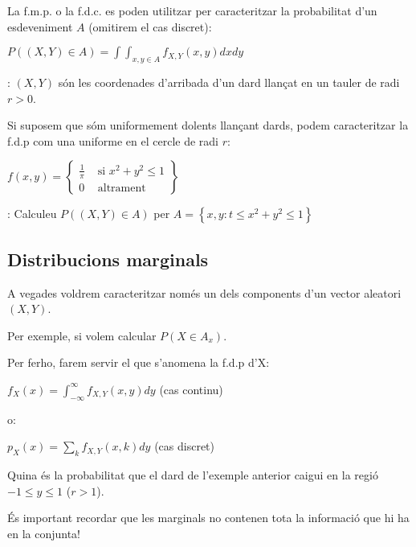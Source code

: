 \documentclass[letterpaper,10pt,english]{sphinxmanual}
\begin{document}
La f.m.p. o la f.d.c. es poden utilitzar per caracteritzar la probabilitat
d’un esdeveniment \(A\) (omitirem el cas discret):

\(P((X, Y) \in A) = \int\int_{x, y \in A} f_{X,Y}(x,y)dx dy\)

: \((X,Y)\) són les coordenades d’arribada d’un dard llançat
en un tauler de radi \(r >0\).

Si suposem que sóm uniformement dolents llançant dards, podem caracteritzar la
f.d.p com una uniforme en el cercle de radi \(r\):

\(f(x,y) = \left\{\begin{array}{cc}\frac{1}{\pi}&\mbox{ si } x^2 + y^2 \leq 1 \\ 0  &\mbox{ altrament } \end{array}\right\}\)

: Calculeu \(P((X, Y) \in A)\) per \(A = \left\{x, y: t \leq x^2 + y^2 \leq 1\right\}\)


\subsection{Distribucions marginals}
\label{\detokenize{0_Intro/0_1_Repas_probabilitat:distribucions-marginals}}
A vegades voldrem caracteritzar només un dels components d’un vector aleatori \((X, Y)\).

Per exemple, si volem calcular \(P(X \in A_x)\).

Per fer\sphinxhyphen{}ho, farem servir el que s’anomena la f.d.p  d’X:

\(f_X(x) = \int_{-\infty}^{\infty} f_{X,Y}(x, y) dy\) (cas continu)

o:

\(p_X(x) = \sum_{k} f_{X,Y}(x, k) dy\) (cas discret)

 Quina és la probabilitat que el dard de l’exemple anterior caigui
en la regió \(-1\leq y \leq 1\) (\(r>1\)).

És important recordar que les marginals no contenen tota la informació que hi ha en la conjunta!
\end{document}
